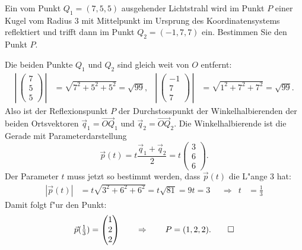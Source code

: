 Ein vom Punkt $Q_1=(7,5,5)$ ausgehender Lichtstrahl wird im Punkt $P$
einer Kugel vom Radius $3$ mit Mittelpunkt im Ursprung des Koordinatensystems
reflektiert und trifft dann im Punkt $Q_2=(-1,7,7)$ ein.
Bestimmen Sie den Punkt $P$.


\begin{loesung}
Die beiden Punkte $Q_1$ und $Q_2$ sind gleich weit von $O$ entfernt:
\begin{align*}
\left|\,\begin{pmatrix} 7\\5\\5 \end{pmatrix} \,\right|
&=\sqrt{7^2+5^2+5^2}=\sqrt{99},
&
\left|\,\begin{pmatrix}-1\\7\\7 \end{pmatrix} \,\right|
&=\sqrt{1^2+7^2+7^2}=\sqrt{99}.
\end{align*}
Also ist der Reflexionspunkt $P$ der Durchstosspunkt der Winkelhalbierenden
der beiden Ortsvektoren $\vec q_1=\overrightarrow{OQ}_1$ und
$\vec q_2=\overrightarrow{OQ}_2$. Die Winkelhalbierende ist
die Gerade mit Parameterdarstellung
\[
\vec p(t)=t\frac{\vec q_1+\vec q_2}2=t\begin{pmatrix} 3\\6\\6 \end{pmatrix}.
\]
Der Parameter $t$ muss jetzt so bestimmt werden, dass $\vec p(t)$ die L"ange
$3$ hat:
\begin{align*}
|\vec p(t)|&=t\sqrt{3^2+6^2+6^2}=t\sqrt{81}=9t=3
&&\Rightarrow&
t&=\frac13
\end{align*}
Damit folgt f"ur den Punkt:
\[
\vec p({\textstyle\frac13})=\begin{pmatrix}1\\2\\2\end{pmatrix}
\qquad\Rightarrow\qquad
P=(1,2,2).
\qedhere
\]
\end{loesung}
